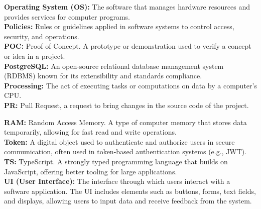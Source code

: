 \textbf{Operating System (OS):} The software that manages hardware resources and provides services for computer programs.\\

\textbf{Policies:} Rules or guidelines applied in software systems to control access, security, and operations.\\

\textbf{POC:} Proof of Concept. A prototype or demonstration used to verify a concept or idea in a project.\\

\textbf{PostgreSQL:} An open-source relational database management system (RDBMS) known for its extensibility and standards compliance.\\

\textbf{Processing:} The act of executing tasks or computations on data by a computer's CPU.\\

\textbf{PR:} Pull Request, a request to bring changes in the source code of the project.

\textbf{RAM:} Random Access Memory. A type of computer memory that stores data temporarily, allowing for fast read and write operations.\\

\textbf{Token:} A digital object used to authenticate and authorize users in secure communication, often used in token-based authentication systems (e.g., JWT).\\

\textbf{TS:} TypeScript. A strongly typed programming language that builds on JavaScript, offering better tooling for large applications.\\


\textbf{UI (User Interface):}  The interface through which users interact with a software application. The UI includes elements such as buttons, forms, text fields, and displays, allowing users to input data and receive feedback from the system.\\




